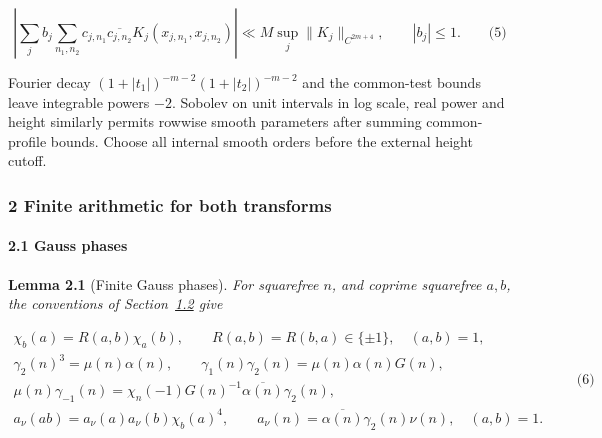 \hypertarget{cf:eq:1.4}{}

\label{cf:eq:1.4}

\[
\left|\sum_jb_j\sum_{n_1,n_2}c_{j,n_1}\overline{c_{j,n_2}}
 K_j(x_{j,n_1},x_{j,n_2})\right|
 \ll M\sup_j\|K_j\|_{C^{2m+4}},\qquad |b_j|\le1.
\qquad\text{(5)}
\]

Fourier decay \((1+|t_1|)^{-m-2}(1+|t_2|)^{-m-2}\) and the common-test bounds leave integrable powers \(-2\). Sobolev on unit intervals in log scale, real power and height similarly permits rowwise smooth parameters after summing common-profile bounds. Choose all internal smooth orders before the external height cutoff.

\hypertarget{cf:finite-arithmetic}{}

\label{cf:finite-arithmetic}

\hypertarget{finite-arithmetic-for-both-transforms}{%
\subsubsection{2 Finite arithmetic for both transforms}\label{finite-arithmetic-for-both-transforms}}

\hypertarget{cf:sec:A.1}{}

\label{cf:sec:A.1}

\hypertarget{gauss-phases}{%
\paragraph{2.1 Gauss phases}\label{gauss-phases}}

\textbf{Lemma 2.1} (Finite Gauss phases). \emph{\hypertarget{cf:finite-phases}{}\label{cf:finite-phases} For squarefree \(n\), and coprime squarefree \(a,b\), the conventions of Section~\protect\hyperlink{cf:sec:1.1}{1.2} give}

\hypertarget{cf:eq:A.1}{}

\label{cf:eq:A.1}

\[
\begin{gathered}
\chi_b(a)=R(a,b)\chi_a(b),\qquad R(a,b)=R(b,a)\in\{\pm1\},\quad (a,b)=1,\\
\gamma_2(n)^3=\mu(n)\alpha(n),\qquad
\gamma_1(n)\gamma_2(n)=\mu(n)\alpha(n)G(n),\\
\mu(n)\gamma_{-1}(n)=\chi_n(-1)G(n)^{-1}\overline{\alpha(n)}\gamma_2(n),\\
a_\nu(ab)=a_\nu(a)a_\nu(b)\chi_b(a)^4,
\qquad a_\nu(n)=\overline{\alpha(n)}\gamma_2(n)\nu(n),\quad (a,b)=1.
\end{gathered}
\qquad\text{(6)}
\]

